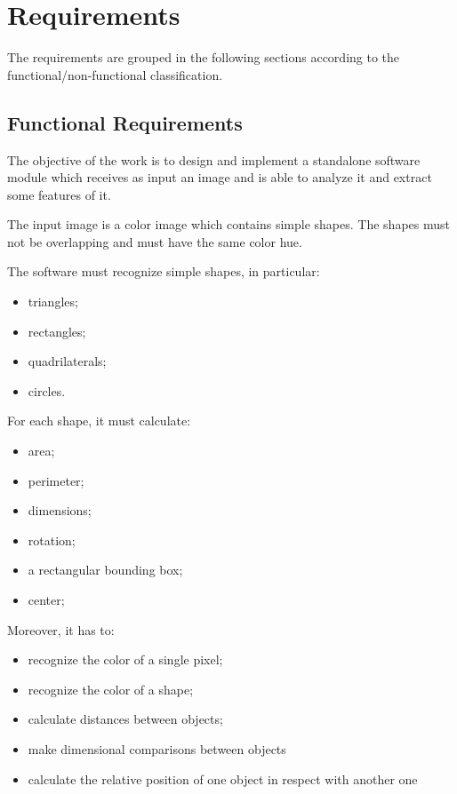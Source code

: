 	\section{Requirements}
	The requirements are grouped in the following sections according to the functional/non-functional classification. 

		\subsection{Functional Requirements}
		The objective of the work is to design and implement a standalone software module which receives as input an image and is able to analyze it and extract some features of it.

		The input image is a color image which contains simple shapes. The shapes must not be overlapping and must have the same color hue.

		The software must recognize simple shapes, in particular:
		\begin{itemize}
	    		\item triangles;
			\item rectangles;
			\item quadrilaterals;
			\item circles.
		\end{itemize}

		For each shape, it must calculate:
		\begin{itemize}
		    	\item area;
		    	\item perimeter;
			\item dimensions;
			\item rotation;
			\item a rectangular bounding box;
			\item center;
		\end{itemize}

		Moreover, it has to:
		\begin{itemize}
			\item recognize the color of a single pixel;
			\item recognize the color of a shape;
		    	\item calculate distances between objects;			
			\item make dimensional comparisons between objects
			\item calculate the relative position of one object in respect with another one
		\end{itemize}

